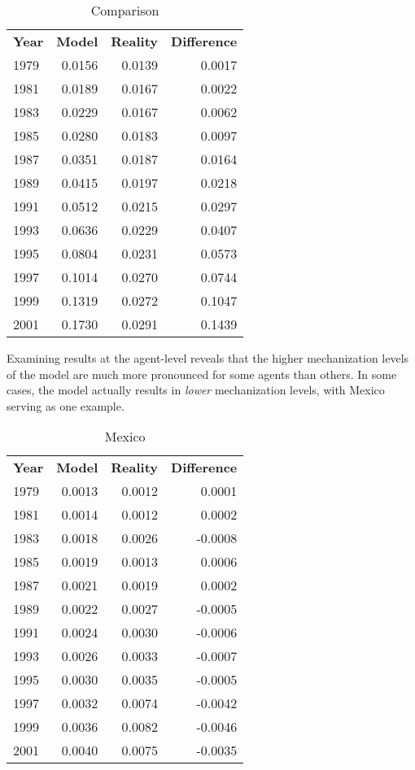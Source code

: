 \documentclass{article}
\begin{document}
\begin{table}[h]
	\centering
	\caption{Comparison}
	\begin{tabular}{|l r r r|}
		\hline
		\textbf{Year} & \textbf{Model} & \textbf{Reality} & \textbf{Difference}\\
		1979 & 0.0156 & 0.0139 & 0.0017 \\
		1981 & 0.0189 & 0.0167 & 0.0022 \\
		1983 & 0.0229 & 0.0167 & 0.0062 \\
		1985 & 0.0280 & 0.0183 & 0.0097 \\
		1987 & 0.0351 & 0.0187 & 0.0164 \\
		1989 & 0.0415 & 0.0197 & 0.0218 \\
		1991 & 0.0512 & 0.0215 & 0.0297 \\
		1993 & 0.0636 & 0.0229 & 0.0407 \\
		1995 & 0.0804 & 0.0231 & 0.0573 \\
		1997 & 0.1014 & 0.0270 & 0.0744 \\
		1999 & 0.1319 & 0.0272 & 0.1047 \\
		2001 & 0.1730 & 0.0291 & 0.1439 \\
		\hline
	\end{tabular}
\end{table}

\newpage

Examining results at the agent-level reveals that the higher mechanization
levels of the model are much more pronounced for some agents than others. In
some cases, the model actually results in \textit{lower} mechanization levels,
with Mexico serving as one example. 

\begin{table}[h]
	\centering
	\caption{Mexico}
	\begin{tabular}{|l r r r|}
		\hline
		\textbf{Year} & \textbf{Model} & \textbf{Reality} & \textbf{Difference}\\
		1979 & 0.0013 & 0.0012 & 0.0001  \\
		1981 & 0.0014 & 0.0012 & 0.0002  \\
		1983 & 0.0018 & 0.0026 & -0.0008 \\
		1985 & 0.0019 & 0.0013 & 0.0006  \\
		1987 & 0.0021 & 0.0019 & 0.0002  \\
		1989 & 0.0022 & 0.0027 & -0.0005 \\
		1991 & 0.0024 & 0.0030 & -0.0006 \\
		1993 & 0.0026 & 0.0033 & -0.0007 \\
		1995 & 0.0030 & 0.0035 & -0.0005 \\
		1997 & 0.0032 & 0.0074 & -0.0042 \\
		1999 & 0.0036 & 0.0082 & -0.0046 \\
		2001 & 0.0040 & 0.0075 & -0.0035 \\
		\hline
	\end{tabular}
\end{table}
\end{document}

